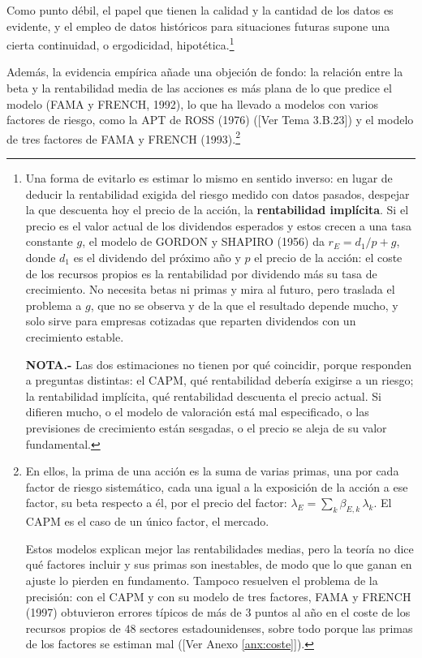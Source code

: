\documentclass[10pt,a4paper]{article}
\newcommand{\authorfont}[1]{{\fontfamily{EBGaramond-TLF}\selectfont #1}}
\begin{document}
Como punto débil, el papel que tienen la calidad y la cantidad de los datos es evidente, y el empleo de datos históricos para situaciones futuras supone una cierta continuidad, o ergodicidad, hipotética.\footnote{%
    Una forma de evitarlo es estimar lo mismo en sentido inverso: en lugar de deducir la rentabilidad exigida del riesgo medido con datos pasados, despejar la que descuenta hoy el precio de la acción, la \textbf{rentabilidad implícita}. Si el precio es el valor actual de los dividendos esperados y estos crecen a una tasa constante $g$, el modelo de GORDON y SHAPIRO (1956) da $r_E=d_1/p+g$, donde $d_1$ es el dividendo del próximo año y $p$ el precio de la acción: el coste de los recursos propios es la rentabilidad por dividendo más su tasa de crecimiento. No necesita betas ni primas y mira al futuro, pero traslada el problema a $g$, que no se observa y de la que el resultado depende mucho, y solo sirve para empresas cotizadas que reparten dividendos con un crecimiento estable.

    \textbf{NOTA.-} Las dos estimaciones no tienen por qué coincidir, porque responden a preguntas distintas: el CAPM, qué rentabilidad debería exigirse a un riesgo; la rentabilidad implícita, qué rentabilidad descuenta el precio actual. Si difieren mucho, o el modelo de valoración está mal especificado, o las previsiones de crecimiento están sesgadas, o el precio se aleja de su valor fundamental.
} 

Además, la evidencia empírica añade una objeción de fondo: la relación entre la beta y la rentabilidad media de las acciones es más plana de lo que predice el modelo (FAMA y FRENCH, 1992), lo que ha llevado a modelos con varios factores de riesgo, como la APT de ROSS (1976) ([\authorfont{Ver Tema 3.B.23}]) y el modelo de tres factores de FAMA y FRENCH (1993).\footnote{%
  En ellos, la prima de una acción es la suma de varias primas, una por cada factor de riesgo sistemático, cada una igual a la exposición de la acción a ese factor, su beta respecto a él, por el precio del factor: $\lambda_E=\sum_k\beta_{E,k}\,\lambda_k$. El CAPM es el caso de un único factor, el mercado.

  Estos modelos explican mejor las rentabilidades medias, pero la teoría no dice qué factores incluir y sus primas son inestables, de modo que lo que ganan en ajuste lo pierden en fundamento. Tampoco resuelven el problema de la precisión: con el CAPM y con su modelo de tres factores, FAMA y FRENCH (1997) obtuvieron errores típicos de más de $3$ puntos al año en el coste de los recursos propios de $48$ sectores estadounidenses, sobre todo porque las primas de los factores se estiman mal ([\authorfont{Ver Anexo \ref{anx:coste}}]). 
} 
\end{document}
